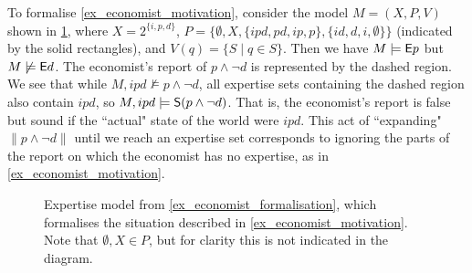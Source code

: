 \begin{example}
    \label{ex_economist_formalisation}

    To formalise \cref{ex_economist_motivation}, consider the model $M = (X, P,
    V)$ shown in \cref{fig_economist_example}, where $X =
    2^{\{i,p,d\}}$, $P = \{\emptyset, X, \{ipd,pd,ip,p\},
    \{id,d,i,\emptyset\}\}$ (indicated by the solid rectangles), and $V(q) =
    \{S \mid q \in S\}$. Then we have $M \models \E p$ but $M \not\models \E
    d$. The economist's report of $p \land \neg d$ is represented by the dashed
    region. We see that while $M, ipd \not\models p \land \neg d$, all
    expertise sets containing the dashed region also contain $ipd$, so $M, ipd
    \models \S(p \land \neg d)$. That is, the economist's report is false but
    sound if the ``actual" state of the world were $ipd$. This act of
    ``expanding" $\|p \land \neg d\|$ until we reach an expertise set
    corresponds to ignoring the parts of the report on which the economist has
    no expertise, as in \cref{ex_economist_motivation}.

\end{example}

\begin{figure}
    \centering
    \caption{
        Expertise model from \cref{ex_economist_formalisation}, which
        formalises the situation described in \cref{ex_economist_motivation}.
        Note that $\emptyset, X \in P$, but for clarity this is not indicated
        in the diagram.
    }
    \label{fig_economist_example}
\end{figure}

